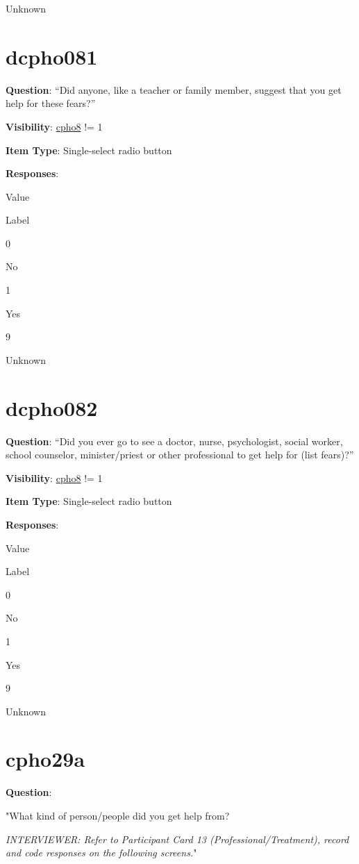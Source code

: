 \documentclass[]{book}
\begin{document}
Unknown

\hypertarget{dcpho081}{%
\section{dcpho081}\label{dcpho081}}

\textbf{Question}: ``Did anyone, like a teacher or family member, suggest that you get help for these fears?''

\textbf{Visibility}: \protect\hyperlink{cpho8}{cpho8} != 1

\textbf{Item Type}: Single-select radio button

\textbf{Responses}:

Value

Label

0

No

1

Yes

9

Unknown

\hypertarget{dcpho082}{%
\section{dcpho082}\label{dcpho082}}

\textbf{Question}: ``Did you ever go to see a doctor, nurse, psychologist, social worker, school counselor, minister/priest or other professional to get help for (list fears)?''

\textbf{Visibility}: \protect\hyperlink{cpho8}{cpho8} != 1

\textbf{Item Type}: Single-select radio button

\textbf{Responses}:

Value

Label

0

No

1

Yes

9

Unknown

\hypertarget{cpho29a}{%
\section{cpho29a}\label{cpho29a}}

\textbf{Question}:

"What kind of person/people did you get help from?

\emph{INTERVIEWER: Refer to Participant Card 13 (Professional/Treatment), record and code responses on the following screens.}"
\end{document}
